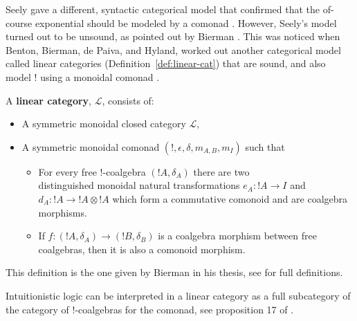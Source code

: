\documentclass{elsarticle}
\begin{document}
Seely gave a different, syntactic categorical model that confirmed
that the of-course exponential should be modeled by a comonad
\cite{Seely:1989}.  However, Seely's model turned out to be unsound,
as pointed out by Bierman \cite{Bierman:1994}.  This 
was noticed when
Benton, Bierman,  de Paiva, and Hyland,  
worked out another categorical
model called linear categories (Definition~\ref{def:linear-cat}) that
are sound, and also model $!$ using a monoidal comonad
\cite{Bierman:1994}.  
\begin{definition}
  \label{def:linear-cat}
  A \textbf{linear category}, $\mathcal{L}$, consists of:
  \begin{center}
    \begin{itemize}
    \item A symmetric monoidal closed category $\mathcal{L}$,
    \item A symmetric monoidal comonad $(!, \epsilon, \delta, m_{A,B},
      m_I)$ such that 
      \begin{itemize}
      \item For every free $!$-coalgebra $(!A,\delta_A)$ there are two\\
        distinguished monoidal natural transformations $e_A : !A \to
        I$ and $d_A : !A \to !A \otimes !A$ which form a commutative
        comonoid and are coalgebra morphisms.
      \item If $f : (!A,\delta_A) \to (!B,\delta_B)$ is a coalgebra
        morphism between free coalgebras, then it is also a comonoid
        morphism.
      \end{itemize}
    \end{itemize}
  \end{center}
  This definition is the one given by Bierman in his thesis, see
  \cite{Bierman:1994} for full definitions.
\end{definition}
\noindent
Intuitionistic logic can be interpreted in a linear category as a
full subcategory of the category of $!$-coalgebras for the comonad,
see proposition 17 of \cite{Bierman:1994}.
\end{document}
